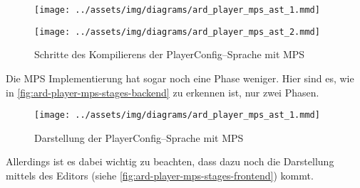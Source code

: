 \begin{figure}[H]
    \begin{framed}
        \texttt{[image: ../assets/img/diagrams/ard\_player\_mps\_ast\_1.mmd]}
    \end{framed}
    \begin{framed}
        \texttt{[image: ../assets/img/diagrams/ard\_player\_mps\_ast\_2.mmd]}
    \end{framed}
    \begin{framed}
        
    \end{framed}
    \caption{Schritte des Kompilierens der PlayerConfig--Sprache mit \acs{MPS}}
    \label{fig:ard-player-mps-stages-backend}
\end{figure}
Die \ac{MPS} Implementierung hat sogar noch eine Phase weniger.
Hier sind es, wie in \autoref{fig:ard-player-mps-stages-backend} zu erkennen ist, nur zwei Phasen.

\begin{figure}[H]
    \begin{framed}
        
    \end{framed}
    \begin{framed}
        \texttt{[image: ../assets/img/diagrams/ard\_player\_mps\_ast\_1.mmd]}
    \end{framed}
    \caption{Darstellung der PlayerConfig--Sprache mit \acs{MPS}}
    \label{fig:ard-player-mps-stages-frontend}
\end{figure}
Allerdings ist es dabei wichtig zu beachten, dass dazu noch die Darstellung mittels des Editors (siehe \autoref{fig:ard-player-mps-stages-frontend}) kommt.

